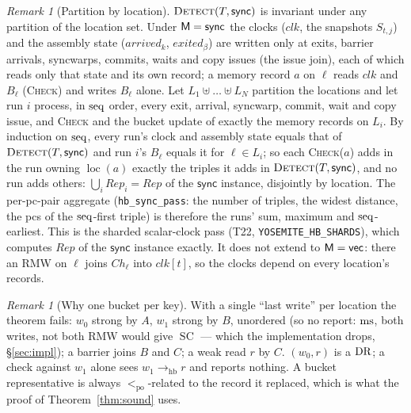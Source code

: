 \documentclass[11pt]{article}
\theoremstyle{remark}
\newtheorem{remark}[theorem]{Remark}
\DeclareMathOperator{\loc}{loc}\DeclareMathOperator{\blk}{blk}\DeclareMathOperator{\kind}{kind}
\DeclareMathOperator{\SC}{SC}
\newcommand{\PO}{<_{\mathrm{po}}}\newcommand{\HB}{\to_{\mathrm{hb}}}\newcommand{\HBr}{\trianglelefteq_{\mathrm{hb}}}
\newcommand{\clk}{\mathit{clk}}\newcommand{\Bk}{B}\newcommand{\Ch}{\mathit{Ch}}\newcommand{\lastr}{\mathit{last}}
\newcommand{\arrv}{\mathit{arrived}}\newcommand{\gone}{\mathit{exited}}\newcommand{\Rep}{\mathit{Rep}}
\begin{document}
\begin{remark}[Partition by location]\label{rem:partition}
$\textsc{Detect}(T,\mathsf{sync})$ is invariant under any partition of the location set.
Under $\mathsf{M}=\mathsf{sync}$ the clocks ($\clk$, the snapshots $S_{t,j}$) and the assembly state
($\arrv_k$, $\gone_\beta$) are written only at exits, barrier arrivals, syncwarps, commits,
waits and copy issues (the issue join), each of which reads only that state and its own
record; a memory record $a$ on $\ell$ reads $\clk$ and $\Bk_\ell$ (\textsc{Check}) and writes
$\Bk_\ell$ alone. Let $L_1\uplus\dots\uplus L_N$ partition the locations and let run $i$
process, in $\operatorname{seq}$ order, every exit, arrival, syncwarp, commit, wait and copy issue, and
\textsc{Check} and the bucket update of exactly the memory records on $L_i$. By induction on
$\operatorname{seq}$, every run's clock and assembly state equals that of $\textsc{Detect}(T,\mathsf{sync})$
and run $i$'s $\Bk_\ell$ equals it for $\ell\in L_i$; so each \textsc{Check}($a$) adds in the
run owning $\loc(a)$ exactly the triples it adds in $\textsc{Detect}(T,\mathsf{sync})$, and no
run adds others: $\bigcup_i\Rep_i=\Rep$ of the $\mathsf{sync}$ instance, disjointly by
location. The per-pc-pair aggregate (\texttt{hb\_sync\_pass}: the number of triples, the
widest distance, the pcs of the $\operatorname{seq}$-first triple) is therefore the runs' sum, maximum and
$\operatorname{seq}$-earliest. This is the sharded scalar-clock pass (T22, \texttt{YOSEMITE\_HB\_SHARDS}),
which computes $\Rep$ of the $\mathsf{sync}$ instance exactly. It does not extend to
$\mathsf{M}=\mathsf{vec}$: there an RMW on $\ell$ joins $\Ch_\ell$ into $\clk[t]$, so the clocks
depend on every location's records.
\end{remark}

\begin{remark}[Why one bucket per key]\label{rem:buckets}
With a single ``last write'' per location the theorem fails: $w_0$ strong by $A$, $w_1$
strong by $B$, unordered (so no report: $\operatorname{ms}$, both writes, not both RMW would give $\SC$ ---
which the implementation drops, \S\ref{sec:impl}); a barrier joins $B$ and $C$; a weak read
$r$ by $C$. $(w_0,r)$ is a $\operatorname{DR}$; a check against $w_1$ alone sees $w_1\HB r$ and reports
nothing. A bucket representative is always $\PO$-related to the record it replaced, which
is what the proof of Theorem~\ref{thm:sound} uses.
\end{remark}
\end{document}
